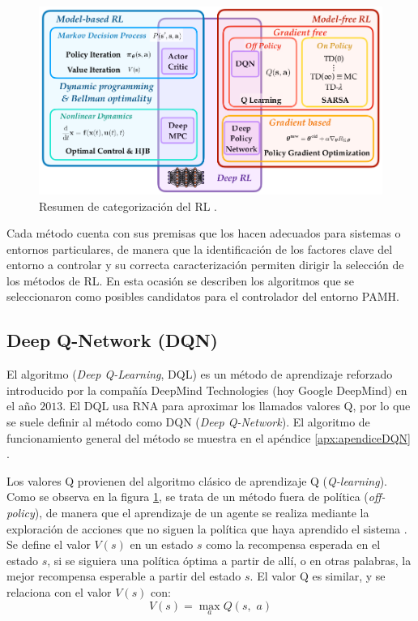 \begin{figure}[hh]
	\centering
	\includegraphics[scale=0.35]{fig/new/CatRL.png}
	\caption{Resumen de categorización del RL \cite{DataScience}.}
	\label{fig:RLcategorias}
\end{figure}

Cada método cuenta con sus premisas que los hacen adecuados para sistemas o entornos particulares, de manera que la identificación de los factores clave del entorno a controlar y su correcta caracterización permiten dirigir la selección de los métodos de RL. En esta ocasión se describen los algoritmos que se seleccionaron como posibles candidatos para el controlador del entorno PAMH.


\subsection{Deep Q-Network (DQN)}

El algoritmo (\textit{Deep Q-Learning}, DQL) es un método de aprendizaje reforzado introducido por la compañía DeepMind Technologies (hoy Google DeepMind) en el año $2013$. El DQL usa RNA para aproximar los llamados valores Q, por lo que se suele definir al método como DQN (\textit{Deep Q-Network}). El algoritmo de funcionamiento general del método se muestra en el apéndice \ref{apx:apendiceDQN} \cite{DQNbase}.

Los valores Q provienen del algoritmo clásico de aprendizaje Q (\textit{Q-learning}). Como se observa en la figura \ref{fig:RLcategorias}, se trata de un método fuera de política (\textit{off-policy}), de manera que el aprendizaje de un agente se realiza mediante la exploración de acciones que no siguen la política que haya aprendido el sistema \cite{DataScience}\cite{DQNexplained}. Se define el valor $V(s)$ en un estado $s$ como la recompensa esperada en el estado $s$, si se siguiera una política óptima a partir de allí, o en otras palabras, la mejor recompensa esperable a partir del estado $s$. El valor Q es similar, y se relaciona con el valor $V(s)$ con:
\begin{equation}
V(s) = \max_a Q(s,\,\, a)
\end{equation}

